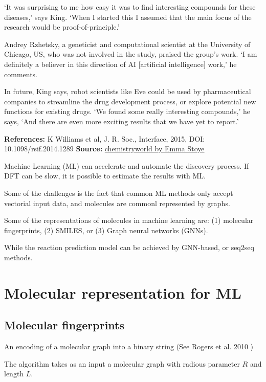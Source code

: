 \begin{mybox}
‘It was surprising to me how easy it was to find interesting compounds for
these diseases,’ says King. ‘When I started this I assumed that the main focus
of the research would be proof-of-principle.’

Andrey Rzhetsky, a geneticist and computational scientist at the University of
Chicago, US, who was not involved in the study, praised the group’s work. ‘I am
definitely a believer in this direction of AI [artificial intelligence] work,’
he comments.

In future, King says, robot scientists like Eve could be used by pharmaceutical
companies to streamline the drug development process, or explore potential new
functions for existing drugs. ‘We found some really interesting compounds,’ he
says, ‘And there are even more exciting results that we have yet to report.’

\textbf{References:}
K Williams et al, J. R. Soc., Interface, 2015, DOI: 10.1098/rsif.2014.1289
\textbf{Source:}
\href{https://www.chemistryworld.com/news/robot-scientist-speeds-up-drug-discovery/8230.article}{chemistryworld
by Emma Stoye}
\end{mybox}

Machine Learning (ML) can accelerate and automate the discovery process. If DFT can
be slow, it is possible to estimate the results with ML.

Some of the challenges is the fact that common ML methods only accept vectorial
input data, and molecules are commonl represented by graphs.

Some of the representations of molecules in machine learning are: (1) molecular
fingerprints, (2) SMILES, or (3) Graph neural networks (GNNs).

While the reaction prediction model can be achieved by \gls{GNN}-based, or seq2seq
methods.

\section{Molecular representation for ML}

\subsection{Molecular fingerprints}

An encoding of a molecular graph into a binary string (See Rogers et al. 2010
\cite{rogers2010extended})

The algorithm takes as an input a molecular graph with radious parameter $R$
and length $L$.

